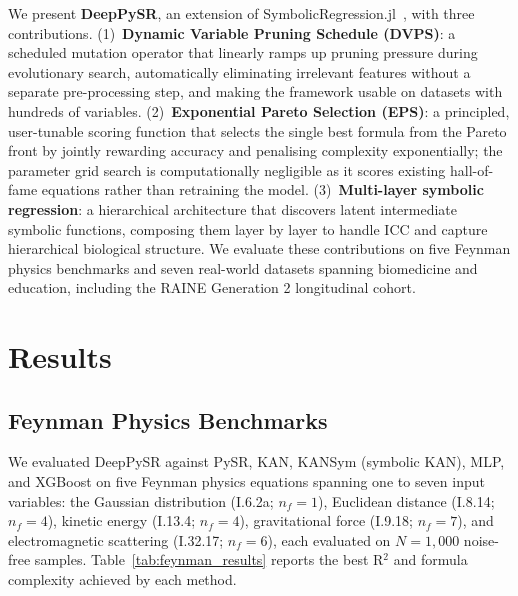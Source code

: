 \documentclass[10pt,twocolumn]{article}
\begin{document}
We present \textbf{DeepPySR}, an extension of SymbolicRegression.jl~\citep{cranmer2023interpretable},
with three contributions.  (1)~\textbf{Dynamic Variable Pruning Schedule
(DVPS)}: a scheduled mutation operator that linearly ramps up pruning pressure
during evolutionary search, automatically eliminating irrelevant features
without a separate pre-processing step, and making the framework usable on
datasets with hundreds of variables.  (2)~\textbf{Exponential Pareto Selection
(EPS)}: a principled, user-tunable scoring function that selects the single best
formula from the Pareto front by jointly rewarding accuracy and penalising
complexity exponentially; the parameter grid search is computationally
negligible as it scores existing hall-of-fame equations rather than retraining
the model.  (3)~\textbf{Multi-layer symbolic regression}: a hierarchical
architecture that discovers latent intermediate symbolic functions, composing
them layer by layer to handle ICC and capture hierarchical biological structure.
We evaluate these contributions on five Feynman physics benchmarks and seven
real-world datasets spanning biomedicine and education, including the RAINE
Generation 2 longitudinal cohort.

\section{Results}
\label{sec:results}

\subsection{Feynman Physics Benchmarks}

We evaluated DeepPySR against PySR, KAN, KANSym (symbolic KAN), MLP, and
XGBoost on five Feynman physics equations spanning one to seven input
variables: the Gaussian distribution (I.6.2a; $n_f = 1$), Euclidean distance
(I.8.14; $n_f = 4$), kinetic energy (I.13.4; $n_f = 4$), gravitational force
(I.9.18; $n_f = 7$), and electromagnetic scattering (I.32.17; $n_f = 6$),
each evaluated on $N = 1{,}000$ noise-free samples.
Table~\ref{tab:feynman_results} reports the best R$^2$ and formula complexity
achieved by each method.
\end{document}
